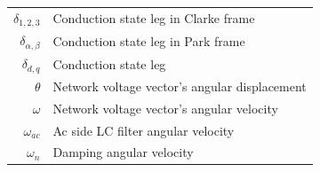 \begin{scriptsize}
\begin{tabularx}{\textwidth}{r|X}
  $\delta_{1,2,3}$                  & Conduction state leg in Clarke frame\\
  $\delta_{\alpha,\beta}$           & Conduction state leg in Park frame\\
  $\delta_{d,q}$                    & Conduction state leg\\
  $\theta$                          & Network voltage vector’s angular displacement\\
  $\omega$                          & Network voltage vector’s angular velocity\\
  $\omega_{ac}$                     & Ac side LC filter angular velocity\\
  $\omega_{n}$                      & Damping angular velocity\\
  \end{tabularx}
  \end{scriptsize}
		
